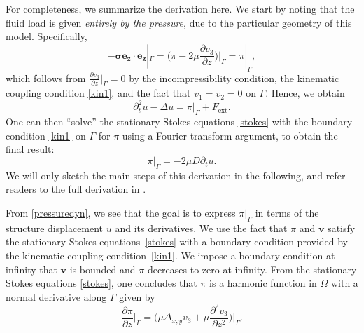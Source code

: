 \documentclass[letterpaper, 11pt,  reqno]{amsart}
\newcommand{\1}{\hspace{0.5mm}\text{I}\hspace{0.2mm}}
\newcommand{\Dl}{\Delta}
\newcommand{\G}{\Gamma}
\newcommand{\dt}{\partial_t}
\numberwithin{equation}{section}
\numberwithin{theorem}{section}
\begin{document}
For completeness, we summarize the derivation here.
We start by noting that the fluid load is given \textit{entirely by the pressure}, due to the particular geometry of this model. Specifically, 
\begin{equation*}
-\boldsymbol{\sigma}\boldsymbol{e_{z}} \cdot \boldsymbol{e_{z}} |_{\Gamma} 
= \bigg( \pi - 2\mu \frac{\partial v_{3}}{\partial z}\bigg)\bigg|_{\Gamma} = \pi|_{\Gamma},
\end{equation*}
which follows from  $\frac{\partial v_{3}}{\partial z}|_\G = 0$ by the incompressibility condition, the kinematic coupling condition \eqref{kin1}, and the fact that $v_{1} = v_{2} = 0$ on $\Gamma$. Hence, we obtain
\begin{equation}\label{pressuredyn}
\partial_{t}^{2} u - \Delta u = \pi|_{\Gamma} + F_{\text{ext}}.
\end{equation}
One can then ``solve'' the stationary Stokes equations \eqref{stokes} with the boundary condition \eqref{kin1} on $\Gamma$ for $\pi$ using a Fourier transform argument, to obtain the final result:
\begin{equation}\label{pressure}
\pi|_{\Gamma} = -2\mu D \dt u.
\end{equation}
We will only sketch the main steps of this derivation 
in the following, and refer  readers to the full derivation in \cite{KC}.

From \eqref{pressuredyn}, we see that the goal is to express  $\pi|_{\Gamma}$ in terms of the structure displacement $u$ and its derivatives. We use the fact that $\pi$ and $\boldsymbol{v}$ satisfy the stationary Stokes equations~\eqref{stokes}
with a boundary condition provided by the kinematic coupling condition~\eqref{kin1}.
We impose a boundary condition at infinity that $\boldsymbol{v}$ is bounded and $\pi$ decreases to zero at infinity. 
From the stationary Stokes equations \eqref{stokes}, one concludes that $\pi$ is a harmonic function in $\Omega$ with a normal derivative along $\Gamma$ given by
\begin{equation}\label{Neumann}
\frac{\partial \pi}{\partial z}\bigg|_{\G} 
= \bigg(\mu \Delta_{x, y} v_{3} + \mu \frac{\partial^{2}v_{3}}{\partial z^{2}}\bigg)\bigg|_{\G} .
\end{equation}
\end{document}
